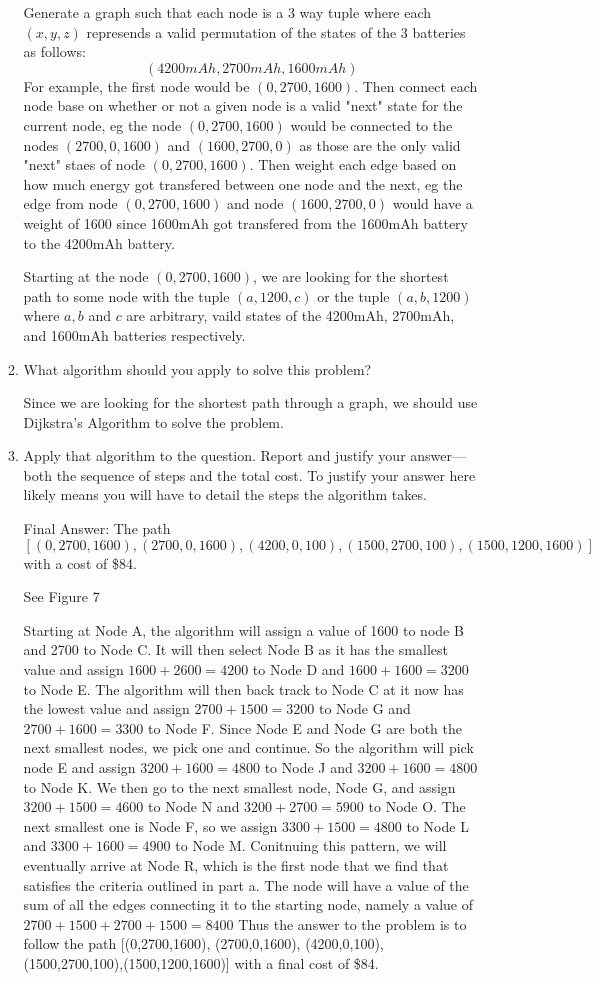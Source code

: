 \documentclass[12pt]{article}
\begin{document}
\begin{enumerate}
\begin{enumerate}
	Generate a graph such that each node is a 3 way tuple where each $(x,y,z)$ represends a valid permutation of the states of the 3 batteries as follows: $$(4200mAh, 2700mAh, 1600mAh)$$ For example, the first node would be $(0, 2700, 1600)$. Then connect each node base on whether or not a given node is a valid "next" state for the current node, eg the node $(0, 2700, 1600)$ would be connected to the nodes $(2700, 0, 1600)$ and $(1600, 2700, 0)$ as those are the only valid "next" staes of node $(0, 2700, 1600)$. Then weight each edge based on how much energy got transfered between one node and the next, eg the edge from node $(0, 2700, 1600)$ and node $(1600, 2700, 0)$ would have a weight of 1600 since 1600mAh got transfered from the 1600mAh battery to the 4200mAh battery. 

	Starting at the node $(0, 2700, 1600)$, we are looking for the shortest path to some node with the tuple $(a, 1200, c)$ or the tuple $(a, b, 1200)$ where $a, b$ and $c$ are arbitrary, vaild states of the 4200mAh, 2700mAh, and 1600mAh batteries respectively.
	\newpage
	\item \label{4b} What algorithm should you apply to solve this problem?
	
	Since we are looking for the shortest path through a graph, we should use Dijkstra's Algorithm to solve the problem.
	\newpage
	
	\item \label{4c} Apply that algorithm to the question. Report and justify your answer---both the sequence of steps and the total cost. To justify your answer here likely means you will have to detail the steps the algorithm takes.

	Final Answer: The path $$[(0,2700,1600), (2700,0,1600), (4200,0,100), (1500,2700,100),(1500,1200,1600)]$$ with a cost of \$84.

	See Figure 7

	Starting at Node A, the algorithm will assign a value of 1600 to node B and 2700 to Node C. It will then select Node B as it has the smallest value and assign $1600+2600=4200$ to Node D and $1600+1600=3200$ to Node E. The algorithm will then back track to Node C at it now has the lowest value and assign $2700+1500=3200$ to Node G and $2700+1600=3300$ to Node F. Since Node E and Node G are both the next smallest nodes, we pick one and continue. So the algorithm will pick node E and assign $3200+1600=4800$ to Node J and $3200+1600=4800$ to Node K. We then go to the next smallest node, Node G, and assign $3200+1500=4600$ to Node N and $3200+2700=5900$ to Node O. The next smallest one is Node F, so we assign $3300+1500=4800$ to Node L and $3300+1600=4900$ to Node M. Conitnuing this pattern, we will eventually arrive at Node R, which is the first node that we find that satisfies the criteria outlined in part a. The node will have a value of the sum of all the edges connecting it to the starting node, namely a value of $2700+1500+2700+1500=8400$ Thus the answer to the problem is to follow the path [(0,2700,1600), (2700,0,1600), (4200,0,100), (1500,2700,100),(1500,1200,1600)] with a final cost of \$84.


\end{enumerate}
\end{enumerate}
\end{document}
